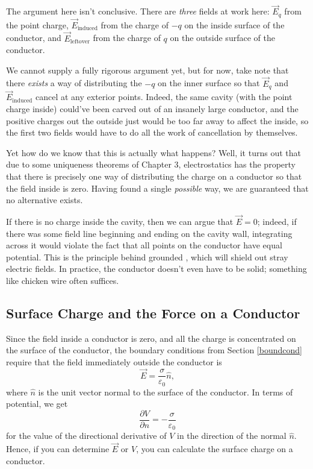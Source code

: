 \begin{remark}
The argument here isn't conclusive. There are \textit{three} fields at work here: $\vec{E}_q$ from the point charge, $\vec{E}_{\text{induced}}$ from the charge of $-q$ on the inside surface of the conductor, and $\vec{E}_{\text{leftover}}$ from the charge of $q$ on the outside surface of the conductor.

We cannot supply a fully rigorous argument yet, but for now, take note that there \textit{exists} a way of distributing the $-q$ on the inner surface so that $\vec{E}_q$ and $\vec{E}_{\text{induced}}$ cancel at any exterior points. Indeed, the same cavity (with the point charge inside) could've been carved out of an insanely large conductor, and the positive charges out the outside just would be too far away to affect the inside, so the first two fields would have to do all the work of cancellation by themselves.

Yet how do we know that this is actually what happens? Well, it turns out that due to some uniqueness theorems of Chapter 3, electrostatics has the property that there is precisely one way of distributing the charge on a conductor so that the field inside is zero. Having found a single \textit{possible} way, we are guaranteed that no alternative exists.
\end{remark}

If there is no charge inside the cavity, then we can argue that $\vec{E}=0$; indeed, if there was some field line beginning and ending on the cavity wall, integrating across it would violate the fact that all points on the conductor have equal potential. This is the principle behind grounded , which will shield out stray electric fields. In practice, the conductor doesn't even have to be solid; something like chicken wire often suffices.

\subsection{Surface Charge and the Force on a Conductor}

Since the field inside a conductor is zero, and all the charge is concentrated on the surface of the conductor, the boundary conditions from Section \ref{boundcond} require that the field immediately outside the conductor is
\[\vec{E}=\frac{\sigma}{\varepsilon_0}\hat{n},\]
where $\hat{n}$ is the unit vector normal to the surface of the conductor. In terms of potential, we get
\[\frac{\partial V}{\partial n}=-\frac{\sigma}{\varepsilon_0}\]
for the value of the directional derivative of $V$ in the direction of the normal $\hat{n}$. Hence, if you can determine $\vec{E}$ or $V$, you can calculate the surface charge on a conductor.

